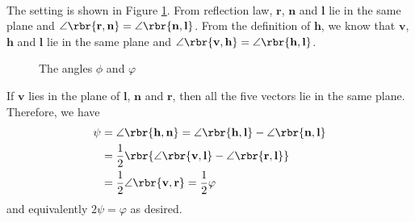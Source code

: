 \documentclass[english, nochinese]{../textmpls/pkupaper}
\title{\titlemark}
\author{\authoring}
\begin{document}
\maketitle

\begin{thmquestion}
\ 
\begin{thmproof}
The setting is shown in Figure \ref{Fig:Fig}. From reflection law, $\mathbf{r}$, $\mathbf{n}$ and $\mathbf{l}$ lie in the same plane and $ \angle \rbr{ \mathbf{r}, \mathbf{n} } = \angle \rbr{ \mathbf{n}, \mathbf{l} } $. From the definition of $\mathbf{h}$, we know that $\mathbf{v}$, $\mathbf{h}$ and $\mathbf{l}$ lie in the same plane and $ \angle \rbr{ \mathbf{v}, \mathbf{h} } = \angle \rbr{ \mathbf{h}, \mathbf{l} } $.
\begin{figure}[htbp]
\centering
{}
\caption{The angles $\phi$ and $\varphi$} \label{Fig:Fig}
\end{figure}

If $\mathbf{v}$ lies in the plane of $\mathbf{l}$, $\mathbf{n}$ and $\mathbf{r}$, then all the five vectors lie in the same plane. Therefore, we have
\begin{equation}
\begin{split}
\psi &= \angle \rbr{ \mathbf{h}, \mathbf{n} } = \angle \rbr{ \mathbf{h}, \mathbf{l} } - \angle \rbr{ \mathbf{n}, \mathbf{l} } \\
&= \frac{1}{2} \rbr{ \angle \rbr{ \mathbf{v}, \mathbf{l} } - \angle \rbr{ \mathbf{r}, \mathbf{l} } } \\
&= \frac{1}{2} \angle \rbr{ \mathbf{v}, \mathbf{r} } = \frac{1}{2} \varphi
\end{split}
\end{equation}
and equivalently $ 2 \psi = \varphi $ as desired.

\sqed
\end{thmproof}
\end{thmquestion}
\end{document}
